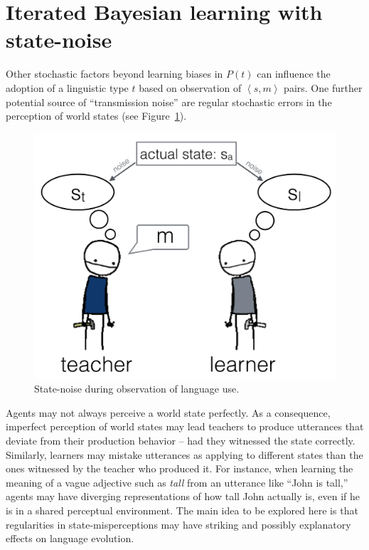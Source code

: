 \documentclass[10pt,a4paper]{article}
\newcommand{\tuple}[1]{\ensuremath{\left\langle #1 \right\rangle}}
\begin{document}
\section{Iterated Bayesian learning with state-noise}

Other stochastic factors beyond learning biases in $P(t)$ can influence the adoption of a
linguistic type $t$ based on observation of $\tuple{s,m}$ pairs. One further potential source
of ``transmission noise'' are regular stochastic errors in the perception of world states (see
Figure~\ref{fig:cartoon}).
%
\begin{figure}[t]
  \centering
  \includegraphics[width = 0.75\linewidth]{pics/cartoon_picture.png}
  \caption{State-noise during observation of language use.}
  \label{fig:cartoon}
\end{figure}
% 
Agents may not always perceive a world state perfectly. As a consequence, imperfect perception of world states
may lead teachers to produce utterances that deviate from their production behavior -- had they
witnessed the state correctly. Similarly, learners may mistake utterances as applying to 
different states than the ones witnessed by the teacher who produced it. For instance, when learning the meaning of a vague adjective
such as {\em tall} from an utterance like ``John is tall,'' agents may have diverging
representations of how tall John actually is, even if he is in a shared perceptual
environment. The main idea to be explored here is that regularities in state-misperceptions may
have striking and possibly explanatory effects on language evolution. 
\end{document}
